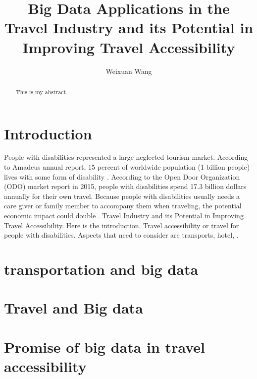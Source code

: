 \title{Big Data Applications in the Travel Industry and its Potential in Improving Travel Accessibility}


\author{Weixuan Wang}


\renewcommand{\shortauthors}{Weixuan Wang}


\begin{abstract}
This is my abstract
\end{abstract}



\maketitle



\section{Introduction}
People with disabilities represented a large neglected tourism market. According to
Amadeus annual report, 15 percent of worldwide population (1 billion people) lives
with some form of disability \cite{Ama}. According to the Open Door Organization (ODO) market report in 2015, people with disabilities spend 17.3 billion dollars annually for their own travel. Because people with disabilities usually needs a care giver or family member to accompany them when traveling, the potential economic impact could double \cite{ODO}. 
Travel Industry and its Potential in Improving Travel Accessibility.
Here is the introduction. Travel accessibility or travel for people with disabilities. Aspects that
need to consider are transports, hotel,   \cite{Ama}.

\section{transportation and big data}

\section{Travel and Big data}

\section{Promise of big data in travel accessibility}

